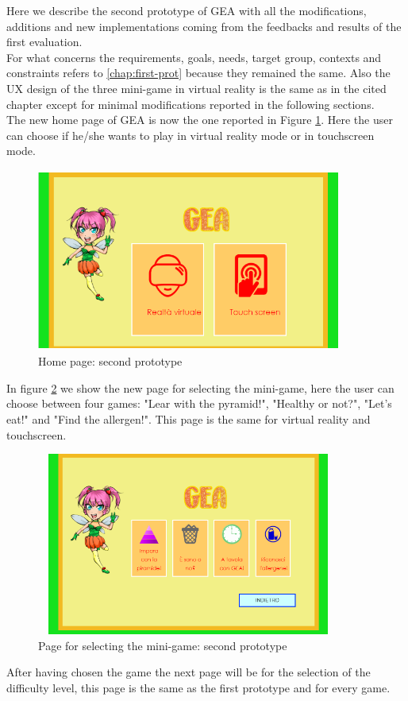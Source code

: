 Here we describe the second prototype of GEA with all the modifications, additions and new implementations coming from the feedbacks and results of the first evaluation.\\
For what concerns the requirements, goals, needs, target group, contexts and constraints refers to \autoref{chap:first-prot} because they remained the same. Also the UX design of the three mini-game in virtual reality is the same as in the cited chapter except for minimal modifications reported in the following sections.\\
The new home page of GEA is now the one reported in Figure \ref{fig:newhomepage}. Here the user can choose if he/she wants to play in virtual reality mode or in touchscreen mode. \\
\begin{figure}[H]
\centering
\includegraphics[width=10cm, height=6cm]{immagini/homepagenew.png}
\caption{Home page: second prototype}\label{fig:newhomepage}
\end{figure}
In figure \ref{fig:newselection} we show the new page for selecting the mini-game, here the user can choose between four games: "Lear with the pyramid!", "Healthy or not?", "Let's eat!" and "Find the allergen!". This page is the same for virtual reality and touchscreen.
\begin{figure}[H]
\centering
\includegraphics[width=10cm, height=6cm]{immagini/selectionnew.png}
\caption{Page for selecting the mini-game: second prototype}\label{fig:newselection}
\end{figure}
After having chosen the game the next page will be for the selection of the difficulty level, this page is the same as the first prototype and for every game.
